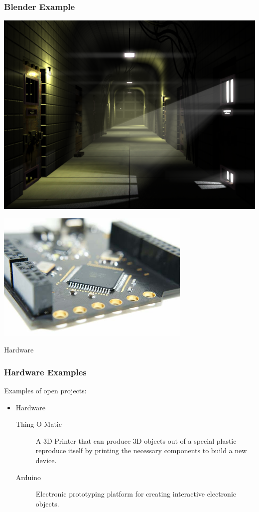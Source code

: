\documentclass{beamer}
\begin{document}
\begin{frame}
  \frametitle{Blender Example}
    \includegraphics[width=\textwidth]{../img/blendermine}
\end{frame}

\begin{frame}
  \begin{center} 
    \includegraphics[width=0.7\textwidth]{../img/hardware}
    \begin{Huge} Hardware \end{Huge} 
  \end{center}
\end{frame}


\begin{frame}
  \frametitle{Hardware Examples}
  Examples of open projects:

  \begin{itemize}
  \item Hardware
    \begin{description}
    \item[Thing-O-Matic] A \textcolor{beamer@myblue}{3D} Printer that
      can produce 3D objects out of a special plastic
      \textcolor{beamer@myblue}{reproduce} itself by printing the
      necessary components to build a new device.
    \item[Arduino] Electronic prototyping platform for creating
      interactive electronic objects.
    \end{description}
  \end{itemize}
\end{frame}
\end{document}
